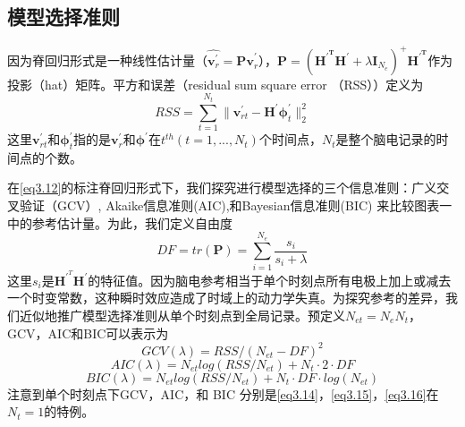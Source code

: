 \subsection{模型选择准则}
因为脊回归形式是一种线性估计量（$\hat{\mathbf{v}^\prime_r}={\mathbf{Pv}^\prime_r}$），$\mathbf{P}=(\mathbf{H^{\prime^T}}\mathbf{H}^\prime+\lambda\mathbf{I}_{N_{e}})^{+}\mathbf{H^{\prime^T}}$作为投影（hat）矩阵。平方和误差（residual sum square error （RSS））定义为
\begin{equation}
RSS=\sum_{t=1}^{N_{t}}\lVert\mathbf{v}^\prime_{rt}-\mathbf{H}^\prime\mathbf{\phi}^\prime_t\rVert_2^2
\end{equation}
这里$\mathbf{v}^\prime_{rt}$和$\mathbf{\phi}^\prime_{t}$指的是$\mathbf{v}^\prime_r$和$\mathbf{\phi}^\prime$在$t^{th}(t=1,...,N_t)$个时间点，$N_t$是整个脑电记录的时间点的个数。

在\eqref{eq3.12}的标注脊回归形式下，我们探究进行模型选择的三个信息准则：广义交叉验证（GCV）, Akaike信息准则(AIC),和Bayesian信息准则(BIC) 来比较图表一中的参考估计量。为此，我们定义自由度
\begin{equation}
DF=tr(\mathbf{P})=\sum_{i=1}^{N_{e}}\dfrac{s_i}{s_i+\lambda}
\end{equation}
这里$s_i$是$\mathbf{H}^{\prime^T}\mathbf{H}^\prime$的特征值。因为脑电参考相当于单个时刻点所有电极上加上或减去一个时变常数，这种瞬时效应造成了时域上的动力学失真。为探究参考的差异，我们近似地推广模型选择准则从单个时刻点到全局记录。预定义$N_{et}=N_eN_t$，GCV，AIC和BIC可以表示为
\begin{equation}\label{eq3.14}
GCV(\lambda)=RSS/(N_{et}-DF)^2
\end{equation}
\begin{equation}\label{eq3.15}
AIC(\lambda)=N_{et}log(RSS/{N_{et}})+N_t\cdot{2}\cdot{DF}
\end{equation}
\begin{equation}\label{eq3.16}
BIC(\lambda)=N_{et}log(RSS/{N_{et}})+N_t\cdot{DF}\cdot{log(N_{et})}
\end{equation}
注意到单个时刻点下GCV，AIC，和 BIC 分别是\eqref{eq3.14}，\eqref{eq3.15}，\eqref{eq3.16}在$N_t=1$的特例。
